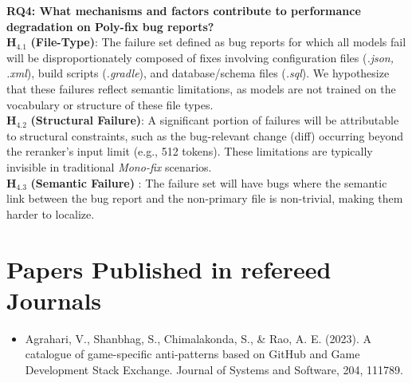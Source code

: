 \documentclass[12pt,table,xcdraw]{article}
\begin{document}
\textbf{RQ4: What mechanisms and factors contribute to performance degradation on Poly-fix bug reports?} \\
$\boldsymbol{H_{4.1}}$ \textbf{(File-Type)}: The failure set defined as bug reports for which all models fail will be disproportionately composed of fixes involving configuration files (\textit{.json, .xml}), build scripts (\textit{.gradle}), and database/schema files (\textit{.sql}). We hypothesize that these failures reflect semantic limitations, as models are not trained on the vocabulary or structure of these file types. \\
$\boldsymbol{H_{4.2}}$ \textbf{(Structural Failure)}: A significant portion of failures will be attributable to structural constraints, such as the bug-relevant change (diff) occurring beyond the reranker’s input limit (e.g., 512 tokens). These limitations are typically invisible in traditional \textit{Mono-fix} scenarios.\\
$\boldsymbol{H_{4.3}}$ \textbf{(Semantic Failure)} : The failure set will have bugs where the semantic link between the bug report and the non-primary file is non-trivial, making them harder to localize.

\section{Papers Published in refereed Journals}
\begin{itemize}
    \item Agrahari, V., Shanbhag, S., Chimalakonda, S., \& Rao, A. E. (2023). A catalogue of game-specific anti-patterns based on GitHub and Game Development Stack Exchange. Journal of Systems and Software, 204, 111789.
\end{itemize}
\end{document}
